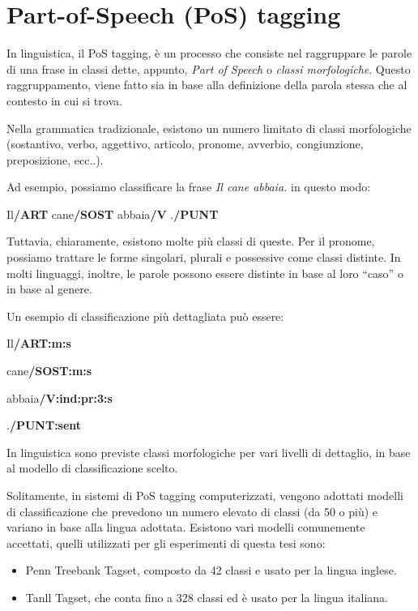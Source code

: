 \section{Part-of-Speech (PoS) tagging}

In linguistica, il PoS tagging, \`e un processo che consiste nel raggruppare le
parole di una frase in classi dette, appunto, \emph{Part of Speech} o \emph{classi
morfologiche}. Questo raggruppamento, viene fatto sia in base alla definizione
della parola stessa che al contesto in cui si trova.

Nella grammatica tradizionale, esistono un numero limitato di classi morfologiche
(sostantivo, verbo, aggettivo, articolo, pronome, avverbio, congiunzione, preposizione, ecc..).

Ad esempio, possiamo classificare la frase \emph{Il cane abbaia.} in questo modo:

\centerline{Il\textbf{/ART} cane\textbf{/SOST} abbaia\textbf{/V} .\textbf{/PUNT}}

Tuttavia, chiaramente, esistono molte pi\`u classi di queste.
Per il pronome, possiamo trattare le forme singolari, plurali e possessive come
classi distinte. In molti linguaggi, inoltre, le parole possono essere distinte
in base al loro ``caso'' o in base al genere.

Un esempio di classificazione pi\`u dettagliata pu\`o essere:

\begin{center}
Il\textbf{/ART:m:s}

cane\textbf{/SOST:m:s}

abbaia\textbf{/V:ind:pr:3:s}

.\textbf{/PUNT:sent}
\end{center}

In linguistica sono previste classi morfologiche per vari livelli di dettaglio,
in base al modello di classificazione scelto.

Solitamente, in sistemi di PoS tagging computerizzati, vengono adottati modelli
di classificazione che prevedono un numero elevato di classi (da 50 o pi\`u) e
variano in base alla lingua adottata. Esistono vari modelli comunemente accettati,
quelli utilizzati per gli esperimenti di questa tesi sono:

\begin{itemize}
  \item Penn Treebank Tagset, composto da 42 classi e usato per la lingua inglese.
  \item Tanll Tagset, che conta fino a 328 classi ed \`e usato per la lingua italiana.
\end{itemize}

